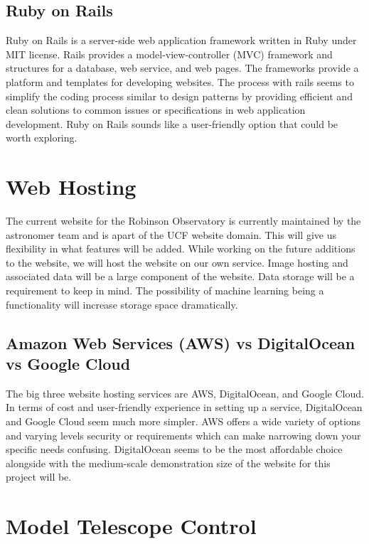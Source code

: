 \documentclass[12pt]{report}
\begin{document}
\subsection*{Ruby on Rails}

Ruby on Rails is a server-side web application framework written in Ruby under MIT license.  Rails provides a model-view-controller (MVC) framework and structures for a database, web service, and web pages.  The frameworks provide a platform and templates for developing websites.  The process with rails seems to simplify the coding process similar to design patterns by providing efficient and clean solutions to common issues or specifications in web application development.  Ruby on Rails sounds like a user-friendly option that could be worth exploring.
 
\section*{Web Hosting}

The current website for the Robinson Observatory is currently maintained by the astronomer team and is apart of the UCF website domain.  This will give us flexibility in what features will be added.  While working on the future additions to the website, we will host the website on our own service.  Image hosting and associated data will be a large component of the website.  Data storage will be a requirement to keep in mind.  The possibility of machine learning being a functionality will increase storage space dramatically.

\subsection*{Amazon Web Services (AWS) vs DigitalOcean vs Google Cloud}

The big three website hosting services are AWS, DigitalOcean, and Google Cloud.  In terms of cost and user-friendly experience in setting up a service, DigitalOcean and Google Cloud seem much more simpler.  AWS offers a wide variety of options and varying levels security or requirements which can make narrowing down your specific needs confusing.  DigitalOcean seems to be the most affordable choice alongside with the medium-scale demonstration size of the website for this project will be.

\section*{Model Telescope Control}
\end{document}
